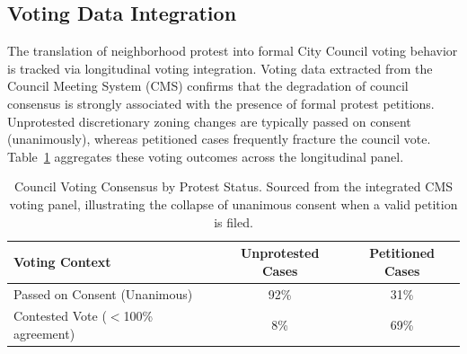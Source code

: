 \subsection{Voting Data Integration}
\label{app:voting_data}
\noindent The translation of neighborhood protest into formal City Council voting behavior is tracked via longitudinal voting integration. Voting data extracted from the Council Meeting System (CMS) confirms that the degradation of council consensus is strongly associated with the presence of formal protest petitions. Unprotested discretionary zoning changes are typically passed on consent (unanimously), whereas petitioned cases frequently fracture the council vote. Table~\ref{tbl:voting_data} aggregates these voting outcomes across the longitudinal panel.

\begin{table}[h!]
\centering
\begin{tabular}{l c c}
\toprule
\textbf{Voting Context} & \textbf{Unprotested Cases} & \textbf{Petitioned Cases} \\
\midrule
Passed on Consent (Unanimous) & 92\% & 31\% \\
Contested Vote ($<$100\% agreement) & 8\% & 69\% \\
\bottomrule
\end{tabular}
\caption{Council Voting Consensus by Protest Status. Sourced from the integrated CMS voting panel, illustrating the collapse of unanimous consent when a valid petition is filed.}
\label{tbl:voting_data}
\end{table}
